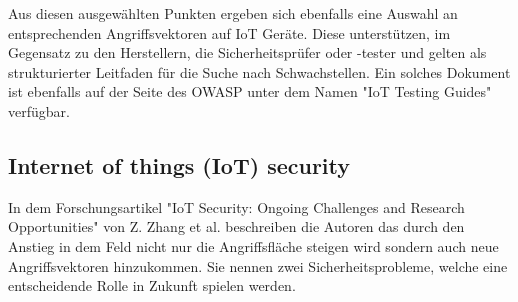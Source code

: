     Aus diesen ausgewählten Punkten ergeben sich ebenfalls eine Auswahl an entsprechenden Angriffsvektoren auf \ac{IoT} Geräte. Diese unterstützen, im Gegensatz zu den Herstellern, die Sicherheitsprüfer oder -tester und gelten als strukturierter Leitfaden für die Suche nach Schwachstellen. Ein solches Dokument ist ebenfalls auf der Seite des \ac{OWASP} unter dem Namen "IoT Testing Guides" %
    verfügbar.
    
    \subsection{Internet of things (IoT) security}
    In dem Forschungsartikel "IoT Security: Ongoing Challenges and Research Opportunities" von Z. Zhang et al. \cite{6978614} beschreiben die Autoren das durch den Anstieg in dem Feld nicht nur die Angriffsfläche steigen wird sondern auch neue Angriffsvektoren hinzukommen.
    Sie nennen zwei Sicherheitsprobleme, welche eine entscheidende Rolle in Zukunft spielen werden.
